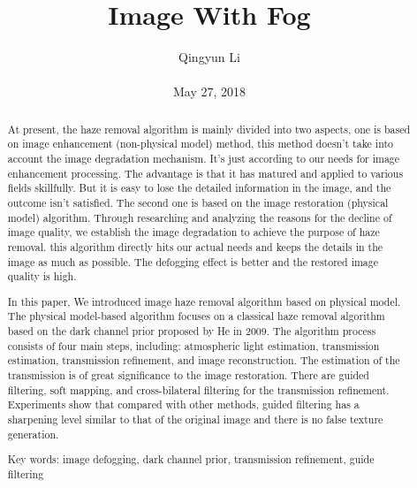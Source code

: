\documentclass[10pt,twocolumn,letterpaper]{article}
\begin{document}
\author{Qingyun Li\\\\
May 27, 2018}        
\title{Image With Fog}

\maketitle

\begin{abstract}
 \par At present, the haze removal algorithm is mainly divided into two aspects, one is based on image enhancement (non-physical model) method, this method doesn’t take into account the image degradation mechanism. It’s just according to our needs for image enhancement processing. The advantage is that it has matured and applied to various fields skillfully. But it is easy to lose the detailed information in the image, and the outcome isn’t satisfied. The second one is based on the image restoration (physical model) algorithm. Through researching and analyzing the reasons for the decline of image quality, we establish the image degradation to achieve the purpose of haze removal. this algorithm directly hits our actual needs and keeps the details in the image as much as possible. The defogging effect is better and the restored image quality is high.
\par In this paper, We introduced image haze removal algorithm based on physical model. The physical model-based algorithm focuses on a classical haze removal algorithm based on the dark channel prior proposed by He in 2009. The algorithm process consists of four main steps, including: atmospheric light estimation, transmission estimation, transmission refinement, and image reconstruction. The estimation of the transmission is of great significance to the image restoration. There are guided filtering, soft mapping, and cross-bilateral filtering for the transmission refinement. Experiments show that compared with other methods, guided filtering has a sharpening level similar to that of the original image and there is no false texture generation.
\par Key words: image defogging, dark channel prior, transmission refinement, guide filtering
\end{abstract}
\end{document}
